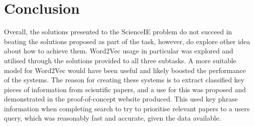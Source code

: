 \chapter{Conclusion}
Overall, the solutions presented to the ScienceIE problem do not succeed in beating the solutions proposed as part of the task, however, do explore other idea about how to achieve them. Word2Vec usage in particular was explored and utilised through the solutions provided to all three subtasks. A more suitable model for Word2Vec would have been useful and likely boosted the performance of the systems. The reason for creating these systems is to extract classified key pieces of information from scientific papers, and a use for this was proposed and demonstrated in the proof-of-concept website produced. This used key phrase information when completing search to try to prioritise relevant papers to a users query, which was reasonably fast and accurate, given the data available. 
